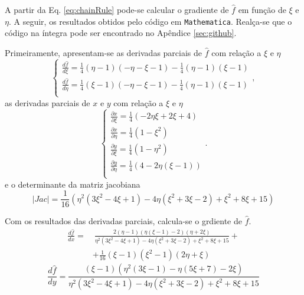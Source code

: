 A partir da Eq. \eqref{eq:chainRule} pode-se calcular o gradiente de $\hat f$ em fun\c{c}\~ao de $\xi$ e $\eta$. A seguir, os resultados obtidos pelo c\'odigo em \texttt{Mathematica}. Real\c{c}a-se que o c\'odigo na \'integra pode ser encontrado no Ap\^endice \ref{sec:github}.

Primeiramente, apresentam-se as derivadas parciais de $\hat f$ com rela\c{c}\~ao a $\xi$ e $\eta$
\begin{equation*}
    \begin{cases}
        \frac{d\hat f}{d\xi} = \frac{1}{4} (\eta -1) (-\eta -\xi -1)-\frac{1}{4} (\eta -1) (\xi -1) \\
        \frac{d\hat f}{d\eta} = \frac{1}{4} (\xi -1) (-\eta -\xi -1)-\frac{1}{4} (\eta -1) (\xi -1)  \\
    \end{cases},
\end{equation*}
as derivadas parciais de $x$ e $y$ com rela\c{c}\~ao a $\xi$ e $\eta$
\begin{equation*}
    \begin{cases}
        \frac{\partial x}{\partial \xi} = \frac{1}{4} (-2 \eta  \xi +2 \xi + 4) \\
        \frac{\partial x}{\partial \eta} = \frac{1}{4} \left(1-\xi ^2\right) \\
        \frac{\partial y}{\partial \xi} = \frac{1}{4} \left(1-\eta ^2\right) \\
        \frac{\partial y}{\partial \eta} = \frac{1}{4} (4-2 \eta  (\xi -1)) \\
    \end{cases}.
\end{equation*}
e o determinante da matriz jacobiana
\begin{equation*}
    |Jac| = \frac{1}{16} \left(\eta ^2 \left(3 \xi ^2-4 \xi +1\right)-4 \eta  \left(\xi ^2+3 \xi -2\right)+\xi ^2+8
    \xi +15\right)
\end{equation*}

Com os resultados das derivadas parciais, calcula-se o grdiente de $\hat f$. 
\begin{equation*}
    \begin{split}
        \frac{d\hat f}{dx} =&~ \frac{2 (\eta -1) (\eta  (\xi -1)-2) (\eta +2 \xi )}{\eta ^2 \left(3 \xi ^2-4 \xi +1\right)-4 \eta 
        \left(\xi ^2+3 \xi -2\right)+\xi ^2+8 \xi +15} +\\
        &+\frac{1}{16} (\xi -1) \left(\xi ^2-1\right) (2 \eta
        +\xi )
    \end{split}
\end{equation*}
\begin{equation*}
    \frac{d\hat f}{dy} = \frac{(\xi -1) \left(\eta ^2 (3 \xi -1)-\eta  (5 \xi +7)-2 \xi \right)}{\eta ^2 \left(3 \xi ^2-4 \xi
    +1\right)-4 \eta  \left(\xi ^2+3 \xi -2\right)+\xi ^2+8 \xi +15}
\end{equation*}

